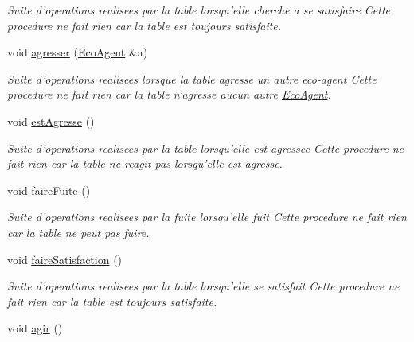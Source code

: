 \begin{CompactItemize}
\begin{CompactList}\small\item\em Suite d'operations realisees par la table lorsqu'elle cherche a se satisfaire Cette procedure ne fait rien car la table est toujours satisfaite. \item\end{CompactList}\item 
void \hyperlink{classTable_e636451a26e8fd61aa9b4c09a92262f7}{agresser} (\hyperlink{classEcoAgent}{EcoAgent} \&a)
\begin{CompactList}\small\item\em Suite d'operations realisees lorsque la table agresse un autre eco-agent Cette procedure ne fait rien car la table n'agresse aucun autre \hyperlink{classEcoAgent}{EcoAgent}. \item\end{CompactList}\item 
\hypertarget{classTable_763c07c018021751ac161382c8469af1}{
void \hyperlink{classTable_763c07c018021751ac161382c8469af1}{estAgresse} ()}
\label{classTable_763c07c018021751ac161382c8469af1}

\begin{CompactList}\small\item\em Suite d'operations realisees par la table lorsqu'elle est agressee Cette procedure ne fait rien car la table ne reagit pas lorsqu'elle est agresse. \item\end{CompactList}\item 
\hypertarget{classTable_cefc0a468fbffa2273c0fbaf73589177}{
void \hyperlink{classTable_cefc0a468fbffa2273c0fbaf73589177}{faireFuite} ()}
\label{classTable_cefc0a468fbffa2273c0fbaf73589177}

\begin{CompactList}\small\item\em Suite d'operations realisees par la fuite lorsqu'elle fuit Cette procedure ne fait rien car la table ne peut pas fuire. \item\end{CompactList}\item 
\hypertarget{classTable_b442e96905d4a14e2eb1151eb6de5481}{
void \hyperlink{classTable_b442e96905d4a14e2eb1151eb6de5481}{faireSatisfaction} ()}
\label{classTable_b442e96905d4a14e2eb1151eb6de5481}

\begin{CompactList}\small\item\em Suite d'operations realisees par la table lorsqu'elle se satisfait Cette procedure ne fait rien car la table est toujours satisfaite. \item\end{CompactList}\item 
\hypertarget{classTable_314f12a86dbd1c133df83f33e2d92bec}{
void \hyperlink{classTable_314f12a86dbd1c133df83f33e2d92bec}{agir} ()}
\label{classTable_314f12a86dbd1c133df83f33e2d92bec}


\end{CompactItemize}
